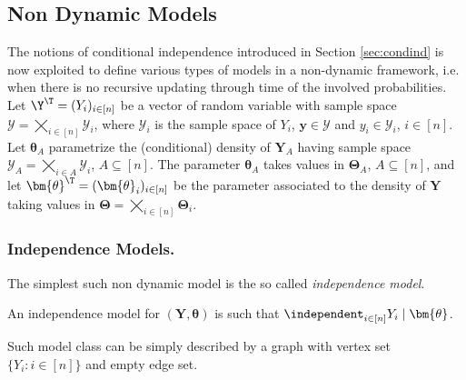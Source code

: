 \begin{comment}
We now list some useful properties for belief's updating that derive from Bayes linear sufficiency statements.
\begin{proposition}
\label{prop:linearproperties}
If $\bci{\bm{Y}_A}{\bm{Y}_B}{\bm{Y}_C}$ then
\begin{itemize}
\item $\E_{\bm{Y}_B}^l(\bm{Y}_A)=\E_{\bm{Y}_B}^l(\E_{\bm{Y}_C}^l(\bm{Y}_A))$;
\item $\V_{\bm{Y}_B}^l(\bm{Y}_A)=\V_{\bm{Y}_C}^l(\bm{Y}_A)+\V_{\Y_B}^l(\E_{\bm{Y}_C}^l(\bm{Y}_A))$;
\item $\V_{\bm{Y}_{B\cup C}}^l(\bm{Y}_A)=\V_{\bm{Y}_C}^l(\bm{Y}_A)$;
\item $\Cov(\bm{Y}_A,\bm{Y}_B)=\Cov(\bm{Y}_A,\bm{Y}_C)\V(\bm{Y}_C)^+\Cov(\bm{Y}_C,\bm{Y}_B)$;
\item $\Cov_{\bm{Y}_B}^l(\bm{Y}_A,\bm{Y}_C)=\Cov_{\bm{Y}_B}^l(\E_{\bm{Y}_C}^l(\bm{Y}_A),\bm{Y}_C)$;
\item $\Cov(\bm{Y}_A,\E_{\bm{Y}_C}^l(\bm{Y}_B))=\Cov(\bm{Y}_A,\bm{Y}_B)$.
\end{itemize}
\end{proposition}
\end{comment} 

\subsection{Non Dynamic Models}
The notions of conditional independence introduced in Section \ref{sec:condind} is now exploited to define various types of models in a non-dynamic framework, i.e. when there is no recursive updating through time of the involved probabilities. Let $\Y^\T=(Y_i)_{i\in[n]}$ be a vector of random variable with sample space $\bm{\mathcal{Y}}=\bigtimes_{i\in[n]}\mathcal{Y}_i$, where $\mathcal{Y}_i$ is the sample space of $Y_i$, $\bm{y}\in\bm{\mathcal{Y}}$ and $y_i\in\mathcal{Y}_i$, $i\in[n]$. Let $\bm{\theta}_A$ parametrize the (conditional) density of $\bm{Y}_A$ having sample space $\bm{\mathcal{Y}}_A=\bigtimes_{i\in A}\mathcal{Y}_i$, $A\subseteq [n]$. The parameter $\bm{\theta}_A$ takes values in $\bm{\Theta}_A$, $A\subseteq [n]$, and let $\bm{\theta}^\T=(\bm{\theta}_i)_{i\in[n]}$  be the parameter associated to the density of $\bm{Y}$ taking values in $\bm{\Theta}=\bigtimes_{i\in[n]}\bm{\Theta}_i$.

\label{sec:nondym}
\subsubsection{Independence Models.}
The simplest such non dynamic model is the so called \textit{independence model}.
\begin{definition}
\label{def:indmodel}
An independence model for $(\bm{Y},\bm{\theta})$ is such that $\independent_{i\in[n]} Y_i\;|\;\bm{\theta}$.
\end{definition} 
Such model class can be simply described by a graph with vertex set  $\{Y_i:i\in[n]\}$ and empty edge set.
 
